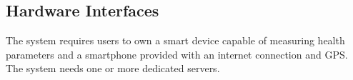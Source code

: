 \subsection{Hardware Interfaces}
The system requires users to own a smart device capable of measuring health parameters and a smartphone provided with an internet connection and GPS.
The system needs one or more dedicated servers.
